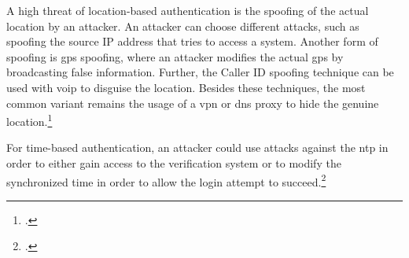 A high threat of location-based authentication is the spoofing of the actual location by an attacker. An attacker can choose different attacks, such as spoofing the source IP address that tries to access a system. Another form of spoofing is \gls{gps} spoofing, where an attacker modifies the actual \gls{gps} by broadcasting false information. Further, the Caller ID spoofing technique can be used with \gls{voip} to disguise the location. Besides these techniques, the most common variant remains the usage of a \gls{vpn} or \gls{dns} proxy to hide the genuine location.\footcites[See][138--145]{517355}[See][Chapter 4.5.3]{30270}[See][115--116,133]{eckert-it-sec-9}

For time-based authentication, an attacker could use attacks against the \gls{ntp} in order to either gain access to the verification system or to modify the synchronized time in order to allow the login attempt to succeed.\footcite[See][]{malhotraattacking}
